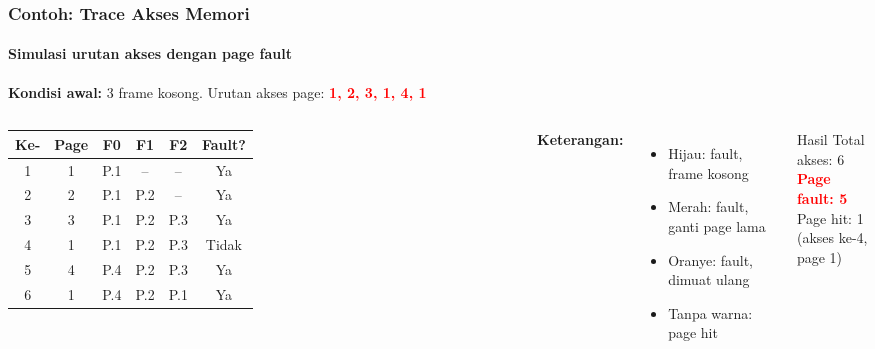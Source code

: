 \documentclass[t,aspectratio=169,xcolor=dvipsnames]{beamer}
\newcommand{\tem}[1]{\textbf{\textcolor{red}{#1}}}
\begin{document}
\begin{frame}
    \frametitle{Contoh: Trace Akses Memori}
    \framesubtitle{Simulasi urutan akses dengan page fault}
    \footnotesize

    \textbf{Kondisi awal:} 3 frame kosong. Urutan akses page: \tem{1, 2, 3, 1, 4, 1}

    \vspace{0.15cm}
    \begin{columns}[T]
        \begin{tabular}{|c|c|c|c|c|c|}
            \hline
            \textbf{Ke-} & \textbf{Page} & \textbf{F0} & \textbf{F1} & \textbf{F2} & \textbf{Fault?} \\
            \hline
            1 & 1 & \cellcolor{green!25}P.1 & --  & --  & \cellcolor{green!25}Ya \\
            \hline
            2 & 2 & P.1 & \cellcolor{green!25}P.2 & --  & \cellcolor{green!25}Ya \\
            \hline
            3 & 3 & P.1 & P.2 & \cellcolor{green!25}P.3 & \cellcolor{green!25}Ya \\
            \hline
            4 & 1 & P.1 & P.2 & P.3 & Tidak \\
            \hline
            5 & 4 & \cellcolor{red!20}P.4 & P.2 & P.3 & \cellcolor{red!20}Ya \\
            \hline
            6 & 1 & P.4 & P.2 & \cellcolor{orange!25}P.1 & \cellcolor{orange!25}Ya \\
            \hline
        \end{tabular}

        \textbf{Keterangan:}
        \begin{itemize}
            \item \colorbox{green!25}{Hijau}: fault, frame kosong
            \item \colorbox{red!20}{Merah}: fault, ganti page lama
            \item \colorbox{orange!25}{Oranye}: fault, dimuat ulang
            \item Tanpa warna: page hit
        \end{itemize}

        \vspace{0.15cm}
        \begin{alertblock}{Hasil}
            Total akses: 6 \\
            \tem{Page fault: 5} \\
            Page hit: 1 \\
            (akses ke-4, page 1)
        \end{alertblock}
    \end{columns}
\end{frame}
\end{document}
